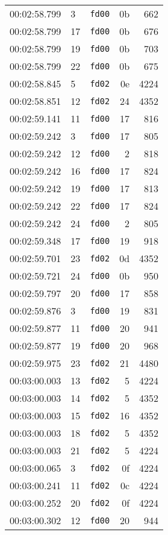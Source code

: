 \documentclass{article}
\begin{document}
\begin{longtable}{lllrr}
00:02:58.799 & 3 & \texttt{fd00} & 0b & 662 \\
00:02:58.799 & 17 & \texttt{fd00} & 0b & 676 \\
00:02:58.799 & 19 & \texttt{fd00} & 0b & 703 \\
00:02:58.799 & 22 & \texttt{fd00} & 0b & 675 \\
00:02:58.845 & 5 & \texttt{fd02} & 0e & 4224 \\
00:02:58.851 & 12 & \texttt{fd02} & 24 & 4352 \\
00:02:59.141 & 11 & \texttt{fd00} & 17 & 816 \\
00:02:59.242 & 3 & \texttt{fd00} & 17 & 805 \\
00:02:59.242 & 12 & \texttt{fd00} & 2 & 818 \\
00:02:59.242 & 16 & \texttt{fd00} & 17 & 824 \\
00:02:59.242 & 19 & \texttt{fd00} & 17 & 813 \\
00:02:59.242 & 22 & \texttt{fd00} & 17 & 824 \\
00:02:59.242 & 24 & \texttt{fd00} & 2 & 805 \\
00:02:59.348 & 17 & \texttt{fd00} & 19 & 918 \\
00:02:59.701 & 23 & \texttt{fd02} & 0d & 4352 \\
00:02:59.721 & 24 & \texttt{fd00} & 0b & 950 \\
00:02:59.797 & 20 & \texttt{fd00} & 17 & 858 \\
00:02:59.876 & 3 & \texttt{fd00} & 19 & 831 \\
00:02:59.877 & 11 & \texttt{fd00} & 20 & 941 \\
00:02:59.877 & 19 & \texttt{fd00} & 20 & 968 \\
00:02:59.975 & 23 & \texttt{fd02} & 21 & 4480 \\
00:03:00.003 & 13 & \texttt{fd02} & 5 & 4224 \\
00:03:00.003 & 14 & \texttt{fd02} & 5 & 4352 \\
00:03:00.003 & 15 & \texttt{fd02} & 16 & 4352 \\
00:03:00.003 & 18 & \texttt{fd02} & 5 & 4352 \\
00:03:00.003 & 21 & \texttt{fd02} & 5 & 4224 \\
00:03:00.065 & 3 & \texttt{fd02} & 0f & 4224 \\
00:03:00.241 & 11 & \texttt{fd02} & 0c & 4224 \\
00:03:00.252 & 20 & \texttt{fd02} & 0f & 4224 \\
00:03:00.302 & 12 & \texttt{fd00} & 20 & 944 \\

\end{longtable}
\end{document}
